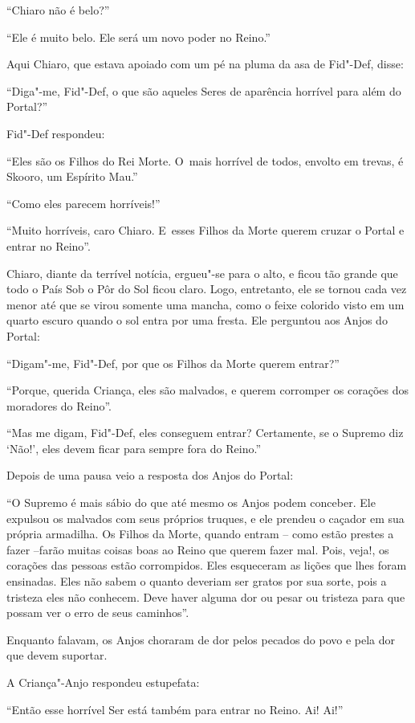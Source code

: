 ``Chiaro não é belo?''

``Ele é muito belo. Ele será um novo poder no Reino.''

Aqui Chiaro, que estava apoiado com um pé na pluma da asa de Fid"-Def,
disse:

``Diga"-me, Fid"-Def, o que são aqueles Seres de aparência horrível para
além do Portal?''

Fid"-Def respondeu:

``Eles são os Filhos do Rei Morte. O~mais horrível de todos, envolto em
trevas, é Skooro, um Espírito Mau.''

``Como eles parecem horríveis!''

``Muito horríveis, caro Chiaro. E~esses Filhos da Morte querem cruzar o
Portal e entrar no Reino''.

Chiaro, diante da terrível notícia, ergueu"-se para o alto, e ficou tão
grande que todo o País Sob o Pôr do Sol ficou claro. Logo, entretanto,
ele se tornou cada vez menor até que se virou somente uma mancha, como o
feixe colorido visto em um quarto escuro quando o sol entra por uma
fresta. Ele perguntou aos Anjos do Portal:

``Digam"-me, Fid"-Def, por que os Filhos da Morte querem entrar?''

``Porque, querida Criança, eles são malvados, e querem corromper os
corações dos moradores do Reino''.

``Mas me digam, Fid"-Def, eles conseguem entrar? Certamente, se o Supremo
diz `Não!', eles devem ficar para sempre fora do Reino.''

Depois de uma pausa veio a resposta dos Anjos do Portal:

``O Supremo é mais sábio do que até mesmo os Anjos podem conceber. Ele
expulsou os malvados com seus próprios truques, e ele prendeu o caçador
em sua própria armadilha. Os Filhos da Morte, quando entram -- como
estão prestes a fazer --farão muitas coisas boas ao Reino que querem
fazer mal. Pois, veja!, os corações das pessoas estão corrompidos. Eles
esqueceram as lições que lhes foram ensinadas. Eles não sabem o quanto
deveriam ser gratos por sua sorte, pois a tristeza eles não conhecem.
Deve haver alguma dor ou pesar ou tristeza para que possam ver o erro de
seus caminhos''.

Enquanto falavam, os Anjos choraram de dor pelos pecados do povo e pela
dor que devem suportar.

A Criança"-Anjo respondeu estupefata:

``Então esse horrível Ser está também para entrar no Reino. Ai! Ai!''


